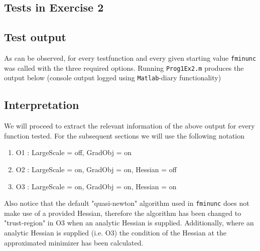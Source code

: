 \documentclass{article}
\begin{document}
	\subsection{Tests in Exercise 2}
	
    \subsection{Test output}
    As can be observed, for every testfunction and every given starting value \texttt{fminunc} was called with the three required options.
    Running \texttt{Prog1Ex2.m} produces the output below (console output logged using \texttt{Matlab}-diary functionality)
    
    
	
	\subsection{Interpretation}
    
    We will proceed to extract the relevant information of the above output for every function tested.
    For the subsequent sections we will use the following notation
    \begin{enumerate}
        \item O1 : LargeScale = off, GradObj = on
        \item O2 : LargeScale = on, GradObj = on, Hessian = off
        \item O3 : LargeScale = on, GradObj = on, Hessian = on
    \end{enumerate}
    Also notice that the default "quasi-newton" algorithm used in \texttt{fminunc} does not make use of a provided Hessian, therefore the algorithm has been changed to "trust-region" in O3 when an analytic Hessian is supplied. Additionally, where an analytic Hessian is supplied (i.e. O3) the condition of the Hessian at the approximated minimizer has been calculated.
\end{document}
